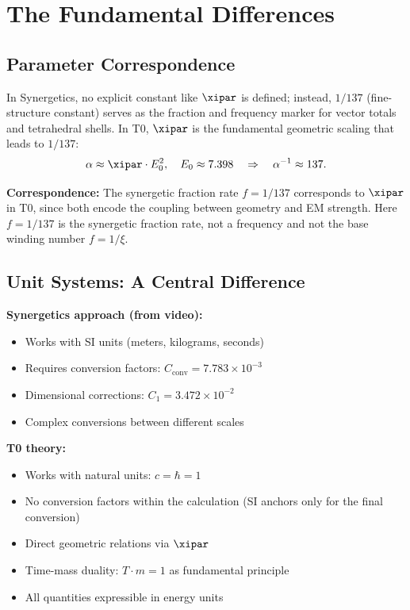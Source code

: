	\section{The Fundamental Differences}
	
	\subsection{Parameter Correspondence}
	
	In Synergetics, no explicit constant like $\xipar$ is defined; instead, $1/137$ (fine-structure constant) serves as the fraction and frequency marker for vector totals and tetrahedral shells. In T0, $\xipar$ is the fundamental geometric scaling that leads to $1/137$:
	\begin{equation}
		\alpha \approx \xipar \cdot E_0^2, \quad E_0 \approx 7.398 \quad \Rightarrow \quad \alpha^{-1} \approx 137.
	\end{equation}
	
	
	\textbf{Correspondence:} The synergetic fraction rate $f = 1/137$ corresponds to $\xipar$ in T0, since both encode the coupling between geometry and EM strength. Here $f = 1/137$ is the synergetic fraction rate, not a frequency and not the base winding number $f = 1/\xi$.

	\subsection{Unit Systems: A Central Difference}
	
	\begin{vergleich}
		\textbf{Synergetics approach (from video):}
		\begin{itemize}
			\item Works with SI units (meters, kilograms, seconds)
			\item Requires conversion factors: $C_{\text{conv}} = 7.783 \times 10^{-3}$
			\item Dimensional corrections: $C_1 = 3.472 \times 10^{-2}$
			\item Complex conversions between different scales
		\end{itemize}
		
		\textbf{T0 theory:}
		\begin{itemize}
			\item Works with natural units: $c = \hbar = 1$
			\item No conversion factors within the calculation (SI anchors only for the final conversion)
			\item Direct geometric relations via $\xipar$
			\item Time-mass duality: $T \cdot m = 1$ as fundamental principle
			\item All quantities expressible in energy units
		\end{itemize}
	\end{vergleich}
	
